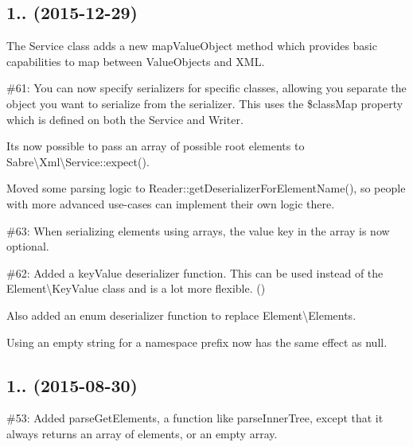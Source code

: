\subsection*{1.. (2015-\/12-\/29) }


\begin{DoxyItemize}
\item The {\ttfamily Service} class adds a new {\ttfamily map\+Value\+Object} method which provides basic capabilities to map between Value\+Objects and X\+ML.
\item \#61\+: You can now specify serializers for specific classes, allowing you separate the object you want to serialize from the serializer. This uses the {\ttfamily \$class\+Map} property which is defined on both the {\ttfamily Service} and {\ttfamily Writer}.
\item It\textquotesingle{}s now possible to pass an array of possible root elements to {\ttfamily Sabre\textbackslash{}Xml\textbackslash{}Service\+::expect()}.
\item Moved some parsing logic to {\ttfamily Reader\+::get\+Deserializer\+For\+Element\+Name()}, so people with more advanced use-\/cases can implement their own logic there.
\item \#63\+: When serializing elements using arrays, the {\ttfamily value} key in the array is now optional.
\item \#62\+: Added a {\ttfamily key\+Value} deserializer function. This can be used instead of the {\ttfamily Element\textbackslash{}Key\+Value} class and is a lot more flexible. ()
\item Also added an {\ttfamily enum} deserializer function to replace {\ttfamily Element\textbackslash{}Elements}.
\item Using an empty string for a namespace prefix now has the same effect as {\ttfamily null}.
\end{DoxyItemize}

\subsection*{1.. (2015-\/08-\/30) }


\begin{DoxyItemize}
\item \#53\+: Added {\ttfamily parse\+Get\+Elements}, a function like {\ttfamily parse\+Inner\+Tree}, except that it always returns an array of elements, or an empty array.
\end{DoxyItemize}

